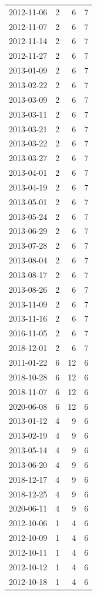 \begin{tabular}{lrrr}
2012-11-06 & 2 & 6 & 7 \\
2012-11-07 & 2 & 6 & 7 \\
2012-11-14 & 2 & 6 & 7 \\
2012-11-27 & 2 & 6 & 7 \\
2013-01-09 & 2 & 6 & 7 \\
2013-02-22 & 2 & 6 & 7 \\
2013-03-09 & 2 & 6 & 7 \\
2013-03-11 & 2 & 6 & 7 \\
2013-03-21 & 2 & 6 & 7 \\
2013-03-22 & 2 & 6 & 7 \\
2013-03-27 & 2 & 6 & 7 \\
2013-04-01 & 2 & 6 & 7 \\
2013-04-19 & 2 & 6 & 7 \\
2013-05-01 & 2 & 6 & 7 \\
2013-05-24 & 2 & 6 & 7 \\
2013-06-29 & 2 & 6 & 7 \\
2013-07-28 & 2 & 6 & 7 \\
2013-08-04 & 2 & 6 & 7 \\
2013-08-17 & 2 & 6 & 7 \\
2013-08-26 & 2 & 6 & 7 \\
2013-11-09 & 2 & 6 & 7 \\
2013-11-16 & 2 & 6 & 7 \\
2016-11-05 & 2 & 6 & 7 \\
2018-12-01 & 2 & 6 & 7 \\
2011-01-22 & 6 & 12 & 6 \\
2018-10-28 & 6 & 12 & 6 \\
2018-11-07 & 6 & 12 & 6 \\
2020-06-08 & 6 & 12 & 6 \\
2013-01-12 & 4 & 9 & 6 \\
2013-02-19 & 4 & 9 & 6 \\
2013-05-14 & 4 & 9 & 6 \\
2013-06-20 & 4 & 9 & 6 \\
2018-12-17 & 4 & 9 & 6 \\
2018-12-25 & 4 & 9 & 6 \\
2020-06-11 & 4 & 9 & 6 \\
2012-10-06 & 1 & 4 & 6 \\
2012-10-09 & 1 & 4 & 6 \\
2012-10-11 & 1 & 4 & 6 \\
2012-10-12 & 1 & 4 & 6 \\
2012-10-18 & 1 & 4 & 6 \\

\end{tabular}
